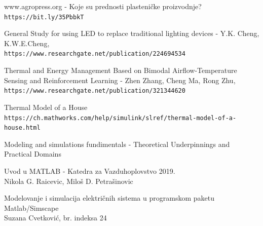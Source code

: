 \documentclass[a4paper,11pt]{book}
\begin{document}
\begin{thebibliography}{9}

  www.agropress.org - Koje su prednosti plasteničke proizvodnje?
  \\\texttt{https://bit.ly/35PbbkT}
  
  General Study for using LED to replace traditional lighting devices - Y.K. Cheng, K.W.E.Cheng,
  \\\texttt{https://www.researchgate.net/publication/224694534}

  Thermal and Energy Management Based on Bimodal Airflow-Temperature Sensing and Reinforcement Learning - Zhen Zhang, Cheng Ma, Rong Zhu,
  \\\texttt{https://www.researchgate.net/publication/321344620}

  Thermal Model of a House
  \\\texttt{https://ch.mathworks.com/help/simulink/slref/thermal-model-of-a-house.html}

  Modeling and simulations fundimentals - Theoretical Underpinnings and Practical Domains

  Uvod u MATLAB - Katedra za Vazduhoplovstvo 2019.\\
  Nikola G. Raicevic, Miloš D. Petrašinovic
  
  Modelovanje i simulacija električnih sistema u programskom paketu Matlab/Simscape\\
  Suzana Cvetković, br. indeksa 24

  \end{thebibliography}
\end{document}
